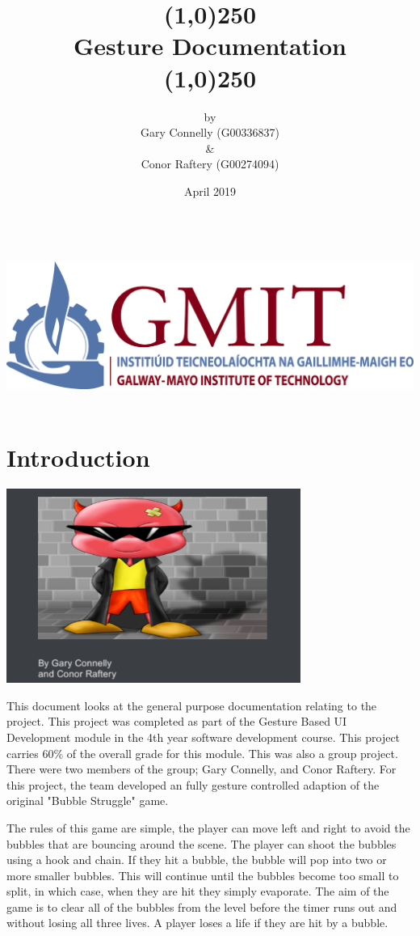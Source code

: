 \documentclass{article}
\title{\line(1,0){250}\\{\Huge \bigskip Gesture Documentation}\\\line(1,0){250}}
\author{ \footnotesize by \\[0.2cm] \footnotesize Gary Connelly (G00336837) \\[0.2cm] \footnotesize \& \\[0.2cm] \footnotesize Conor Raftery (G00274094)}
\date{\footnotesize April 2019}
\begin{document}
\maketitle
\bigskip
\bigskip
\bigskip
\bigskip
\bigskip
\bigskip
\bigskip
\bigskip
\bigskip
\bigskip
\bigskip
\bigskip
\includegraphics[width=\textwidth, height=150pt]{img/gmit-logo.jpg}

\tableofcontents

\clearpage
\section{Introduction}
\includegraphics[width=\textwidth, height=180pt]{img/splash2.PNG}

\bigskip


This document looks at the general purpose documentation relating to the project. This project was completed as part of the Gesture Based UI Development module in the 4th year software development course.  This project carries 60\% of the overall grade for this module. This was also a group project. There were two members of the group; Gary Connelly, and Conor Raftery. For this project, the team developed an fully gesture controlled adaption of the original "Bubble Struggle" game. 

\bigskip

The rules of this game are simple, the player can move left and right to avoid the bubbles that are bouncing around the scene. The player can shoot the bubbles using a hook and chain. If they hit a bubble, the bubble will pop into two or more smaller bubbles. This will continue until the bubbles become too small to split, in which case, when they are hit they simply evaporate. The aim of the game is to clear all of the bubbles from the level before the timer runs out and without losing all three lives. A player loses a life if they are hit by a bubble.
\end{document}
